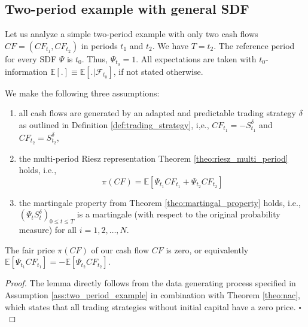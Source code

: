 \subsection{Two-period example with general SDF}


Let us analyze a simple two-period example with only two cash flows $CF=\left( {CF}_{t_1}, {CF}_{t_2} \right)$ in periods $t_1$ and $t_2$.
We have $T=t_2$.
The reference period for every SDF $\Psi$ is $t_0$.
Thus, $\Psi_{t_0}=1$.
All expectations are taken with $t_0$-information $\mathbb{E} \left[ . \right] \equiv \mathbb{E} \left[ . | \mathcal{F}_{t_0}  \right]$, if not stated otherwise.
\begin{assume}
	\label{ass:two_period_example}
	We make the following three assumptions: \\
	\begin{enumerate}
		\item all cash flows are generated by an adapted and predictable trading strategy $\delta$ as outlined in Definition \ref{def:trading_strategy}, i,e., $CF_{t_1}=-S_{t_1}^{\delta}$ and $CF_{t_2}=S_{t_2}^{\delta}$,
		\item the multi-period Riesz representation Theorem \ref{theo:riesz_multi_period} holds, i.e., 
		\[
		\pi(CF) = \mathbb{E} \left[ \Psi_{t_1} {CF}_{t_1} + \Psi_{t_2} {CF}_{t_2} \right]
		\]
		\item the martingale property from Theorem \ref{theo:martingal_property} holds, i.e., $(\Psi_t S_{t}^{\delta})_{0 \leq t \leq T}$ is a martingale (with respect to the original probability measure) for all $i=1,2,\dots,N$.
	\end{enumerate}
\end{assume}

\begin{lemma}
	The fair price $\pi(CF)$ of our cash flow $CF$ is zero, or equivalently
	$\mathbb{E} \left[ \Psi_{t_1} CF_{t_1} \right] = - \mathbb{E} \left[ \Psi_{t_2} CF_{t_2} \right]$.
\end{lemma}

\begin{proof}
	The lemma directly follows from the data generating process specified in Assumption \ref{ass:two_period_example} in combination with Theorem \ref{theo:nac}, which states that all trading strategies without initial capital have a zero price. 
	$\square$
\end{proof}

